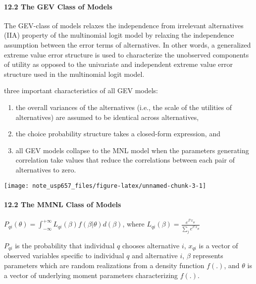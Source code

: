 \documentclass[
]{article}
\begin{document}
\hypertarget{the-gev-class-of-models}{%
\paragraph{12.2 The GEV Class of Models}\label{the-gev-class-of-models}}

The GEV-class of models relaxes the independence from irrelevant
alternatives (IIA) property of the multinomial logit model by relaxing
the independence assumption between the error terms of alternatives. In
other words, a generalized extreme value error structure is used to
characterize the unobserved components of utility as opposed to the
univariate and independent extreme value error structure used in the
multinomial logit model.

three important characteristics of all GEV models:

\begin{enumerate}
\def\labelenumi{(\arabic{enumi})}
\item
  the overall variances of the alternatives (i.e., the scale of the
  utilities of alternatives) are assumed to be identical across
  alternatives,
\item
  the choice probability structure takes a closed-form expression, and
\item
  all GEV models collapse to the MNL model when the parameters
  generating correlation take values that reduce the correlations
  between each pair of alternatives to zero.
\end{enumerate}

\texttt{[image: note\_usp657\_files/figure-latex/unnamed-chunk-3-1]}

\hypertarget{the-mmnl-class-of-models}{%
\paragraph{12.2 The MMNL Class of
Models}\label{the-mmnl-class-of-models}}

\(P_{qi}(\theta)=\int_{-\infty}^{+\infty}L_{qi}(\beta)f(\beta|\theta)d(\beta)\),
where \(L_{qi}(\beta)=\frac{e^{\beta'x_{qi}}}{\sum_je^{\beta'x_{qi}}}\)

\(P_{qi}\) is the probability that individual \(q\) chooses alternative
\(i\), \(x_{qi}\) is a vector of observed variables specific to
individual \(q\) and alternative \(i\), \(\beta\) represents parameters
which are random realizations from a density function \(f(.)\), and
\(\theta\) is a vector of underlying moment parameters characterizing
\(f(.)\).
\end{document}
